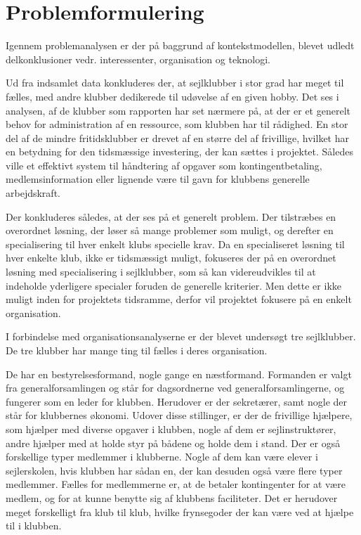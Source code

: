 \chapter{Problemformulering}\label{chap:problemformulering}


Igennem problemanalysen er der på baggrund af kontekstmodellen, blevet udledt delkonklusioner vedr. interessenter, organisation og teknologi.

Ud fra indsamlet data konkluderes der, at sejlklubber i stor grad har meget til fælles, med andre klubber dedikerede til udøvelse af en given hobby. Det ses i analysen, af de klubber som rapporten har set nærmere på, at der er et generelt behov for administration af en ressource, som klubben har til rådighed. En stor del af de mindre fritidsklubber er drevet af en større del af frivillige, hvilket har en betydning for den tidsmæssige investering, der kan sættes i projektet. Således ville et effektivt system til håndtering af opgaver som kontingentbetaling, medlemsinformation eller lignende være til gavn for klubbens generelle arbejdskraft.

Der konkluderes således, at der ses på et generelt problem. Der tilstræbes en overordnet løsning, der løser så mange problemer som muligt, og derefter en specialisering til hver enkelt klubs specielle krav. Da en specialiseret løsning til hver enkelte klub, ikke er tidsmæssigt muligt, fokuseres der på en overordnet løsning med specialisering i sejlklubber, som så kan videreudvikles til at indeholde yderligere specialer foruden de generelle kriterier. Men dette er ikke muligt inden for projektets tidsramme, derfor vil projektet fokusere på en enkelt organisation. 

I forbindelse med organisationsanalyserne er der blevet undersøgt tre sejlklubber. De tre klubber har mange ting til fælles i deres organisation.

De har en bestyrelsesformand, nogle gange en næstformand. Formanden er valgt fra generalforsamlingen og står for
dagsordnerne ved generalforsamlingerne, og fungerer som en leder for klubben. Herudover er der sekretærer, samt nogle
der står for klubbernes økonomi. Udover disse stillinger, er der de frivillige hjælpere, som hjælper med diverse opgaver
i klubben, nogle af dem er sejlinstruktører, andre hjælper med at holde styr på bådene og holde dem i stand. Der er også
forskellige typer medlemmer i klubberne. Nogle af dem kan være elever i sejlerskolen, hvis klubben har sådan en, der kan
desuden også være flere typer medlemmer. Fælles for medlemmerne er, at de betaler kontingenter for at være medlem, og for
at kunne benytte sig af klubbens faciliteter. Det er herudover meget forskelligt fra klub til klub, hvilke frynsegoder
der kan være ved at hjælpe til i klubben.

